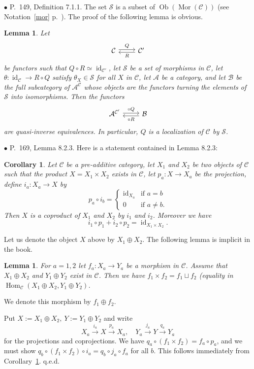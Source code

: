\documentclass[12pt]{article}
\newtheorem{lem}[thm]{Lemma}
\newtheorem{cor}[thm]{Corollary}
\theoremstyle{remark}
\newcommand{\bu}{\bullet}
\newcommand{\n}{\noindent}
\newcommand{\cc}{\mathcal}
\newcommand{\A}{\mathcal A}
\newcommand{\B}{\mathcal B}
\newcommand{\C}{\mathcal C}
\newcommand{\xr}{\xrightarrow}
\DeclareMathOperator{\id}{id}
\DeclareMathOperator{\h}{Hom}
\DeclareMathOperator{\Mor}{Mor}
\DeclareMathOperator{\Ob}{Ob}
\begin{document}

\n$\bu$ P.~149, Definition 7.1.1. The set $\cc S$ is a subset of $\Ob(\Mor(\C))$ (see Notation~\ref{mor} p.~\pageref{mor}). The proof of the following lemma is obvious. 
%
\begin{lem}\label{711}
%
Let 
$$
\begin{tikzcd}\C\ar[yshift=.5ex]{r}{Q}&\C'\ar[yshift=-.4ex]{l}{R}\end{tikzcd}
$$ 
be functors such that $Q\circ R\simeq\id_{\C'}$, let $\cc S$ be a set of morphisms in $\C$, let $\theta:\id_\C\to R\circ Q$ satisfy $\theta_X\in\cc S$ for all $X$ in $\C$, let $\A$ be a category, and let $\B$ be the full subcategory of $\A^\C$ whose objects are the functors turning the elements of $\cc S$ into isomorphisms. Then the functors 
$$
\begin{tikzcd}\A^{\C'}\ar[yshift=.4ex]{r}{\circ Q}&\B\ar[yshift=-.5ex]{l}{\circ R}\end{tikzcd}
$$ 
are quasi-inverse equivalences. In particular, $Q$ is a localization of $\C$ by $\cc S$.
%
\end{lem}


\n$\bu$ P.~169, Lemma 8.2.3. Here is a statement contained in Lemma 8.2.3:
%
\begin{cor}\label{823}
%
Let $\C$ be a pre-additive category, let $X_1$ and $X_2$ be two objects of $\C$ such that the product $X=X_1\times X_2$ exists in $\C$, let $p_a:X\to X_a$ be the projection, define $i_a:X_a\to X$ by 
$$
p_a\circ i_b=\begin{cases}\id_{X_a}&\text{if }a=b\\0&\text{if }a\not=b.\end{cases}
$$ 
Then $X$ is a coproduct of $X_1$ and $X_2$ by $i_1$ and $i_2$. Moreover we have 
$$
i_1\circ p_1+i_2\circ p_2=\id_{X_1\times X_2}.
$$
\end{cor}

Let us denote the object $X$ above by $X_1\oplus X_2$. The following lemma is implicit in the book. 

\begin{lem}
For $a=1,2$ let $f_a:X_a\to Y_a$ be a morphism in $\C$. Assume that $X_1\oplus X_2$ and $Y_1\oplus Y_2$ exist in $\C$. Then we have $f_1\times f_2=f_1\sqcup f_2$ (equality in $\h_\C(X_1\oplus X_2,Y_1\oplus Y_2)$. 
\end{lem} 

We denote this morphism by $f_1\oplus f_2$.\medskip 

\n{\em Proof.} Put $X:=X_1\oplus X_2,\ Y:=Y_1\oplus Y_2$ and write 
$$
X_a\xr{i_a}X\xr{p_a}X_a,\quad Y_a\xr{j_a}Y\xr{q_a}Y_a
$$ 
for the projections and coprojections. We have $q_a\circ(f_1\times f_2)=f_a\circ p_a$, and we must show $q_b\circ (f_1\times f_2)\circ i_a=q_b\circ j_a\circ f_a$ for all $b$. This follows immediately from Corollary~\ref{823}. q.e.d. 
\end{document}
